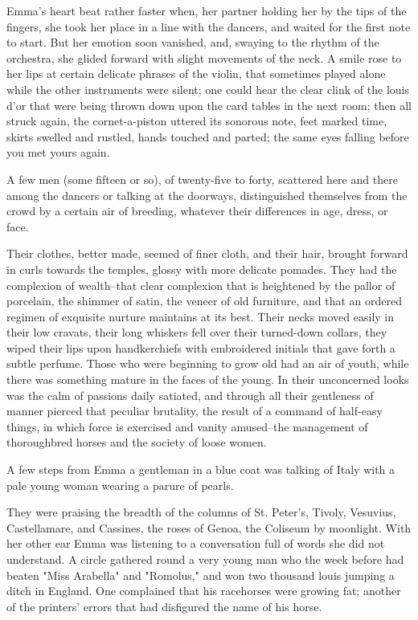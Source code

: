 \documentclass{tufte-book}
\begin{document}
Emma's heart beat rather faster when, her partner holding her by the
tips of the fingers, she took her place in a line with the dancers, and
waited for the first note to start. But her emotion soon vanished, and,
swaying to the rhythm of the orchestra, she glided forward with slight
movements of the neck. A smile rose to her lips at certain delicate
phrases of the violin, that sometimes played alone while the other
instruments were silent; one could hear the clear clink of the louis
d'or that were being thrown down upon the card tables in the next room;
then all struck again, the cornet-a-piston uttered its sonorous note,
feet marked time, skirts swelled and rustled, hands touched and parted;
the same eyes falling before you met yours again.

A few men (some fifteen or so), of twenty-five to forty, scattered here
and there among the dancers or talking at the doorways, distinguished
themselves from the crowd by a certain air of breeding, whatever their
differences in age, dress, or face.

Their clothes, better made, seemed of finer cloth, and their hair,
brought forward in curls towards the temples, glossy with more delicate
pomades. They had the complexion of wealth--that clear complexion that
is heightened by the pallor of porcelain, the shimmer of satin, the
veneer of old furniture, and that an ordered regimen of exquisite
nurture maintains at its best. Their necks moved easily in their low
cravats, their long whiskers fell over their turned-down collars, they
wiped their lips upon handkerchiefs with embroidered initials that gave
forth a subtle perfume. Those who were beginning to grow old had an air
of youth, while there was something mature in the faces of the young.
In their unconcerned looks was the calm of passions daily satiated, and
through all their gentleness of manner pierced that peculiar brutality,
the result of a command of half-easy things, in which force is exercised
and vanity amused--the management of thoroughbred horses and the society
of loose women.

A few steps from Emma a gentleman in a blue coat was talking of Italy
with a pale young woman wearing a parure of pearls.

They were praising the breadth of the columns of St. Peter's, Tivoly,
Vesuvius, Castellamare, and Cassines, the roses of Genoa, the Coliseum
by moonlight. With her other ear Emma was listening to a conversation
full of words she did not understand. A circle gathered round a very
young man who the week before had beaten "Miss Arabella" and "Romolus,"
and won two thousand louis jumping a ditch in England. One complained
that his racehorses were growing fat; another of the printers' errors
that had disfigured the name of his horse.
\end{document}
